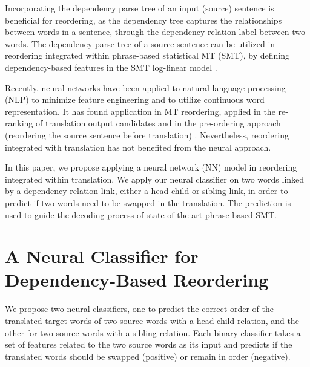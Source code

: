 \documentclass[letterpaper]{article}
\begin{document}
Incorporating the dependency parse tree of an input (source) sentence is beneficial for reordering, as the dependency tree captures the relationships between words in a sentence, through the dependency relation label between two words. The dependency parse tree of a source sentence can be utilized in reordering integrated within phrase-based statistical MT (SMT), by defining dependency-based features in the SMT log-linear model \cite{chang_discriminative_2009,hadiwinoto_swap_2016}.

Recently, neural networks have been applied to natural language processing (NLP) to minimize feature engineering and to utilize continuous word representation. It has found application in MT reordering, applied in the re-ranking of translation output candidates \cite{li_neural_2014,cui_lstm_2016} and in the pre-ordering approach (reordering the source sentence before translation) \cite{de_gispert_fast_2015,miceli-barone_non-projective_2015}. Nevertheless, reordering integrated with translation has not benefited from the neural approach.

In this paper, we propose applying a neural network (NN) model in reordering integrated within translation. We apply our neural classifier on two words linked by a dependency relation link, either a head-child or sibling link, in order to predict if two words need to be swapped in the translation. The prediction is used to guide the decoding process of state-of-the-art phrase-based SMT.

\section{A Neural Classifier for Dependency-Based Reordering}

We propose two neural classifiers, one to predict the correct order of the translated target words of two source words with a head-child relation, and the other for two source words with a sibling relation. Each binary classifier takes a set of features related to the two source words as its input and predicts if the translated words should be swapped (positive) or remain in order (negative).
\end{document}
